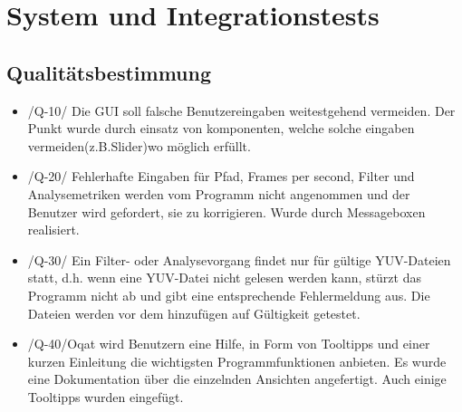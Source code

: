 \chapter{System und Integrationstests}
\section{Qualitätsbestimmung}
\begin{itemize}
\item /Q-10/ Die GUI soll falsche Benutzereingaben weitestgehend vermeiden. \newline
Der Punkt wurde durch einsatz von komponenten, welche solche eingaben vermeiden(z.B.Slider)wo möglich erfüllt.
\item /Q-20/ Fehlerhafte Eingaben für Pfad, Frames per second, Filter und Analysemetriken werden vom Programm nicht angenommen und der Benutzer wird gefordert, sie zu korrigieren. \newline
Wurde durch Messageboxen realisiert.
\item /Q-30/ Ein Filter- oder Analysevorgang findet nur für gültige YUV-Dateien statt, d.h. wenn eine YUV-Datei nicht gelesen werden kann, stürzt das Programm nicht ab und gibt eine entsprechende Fehlermeldung aus. \newline
Die Dateien werden vor dem hinzufügen auf Gültigkeit getestet.
\item  /Q-40/Oqat wird Benutzern eine Hilfe, in Form von Tooltipps und einer kurzen Einleitung die wichtigsten Programmfunktionen anbieten. \newline
Es wurde eine Dokumentation über die einzelnden Ansichten angefertigt. Auch einige Tooltipps wurden eingefügt.

\end{itemize}
